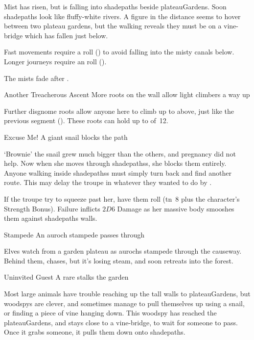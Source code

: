 \begin{boxtext}
  Mist has risen, but is falling into \gls{shadepaths} beside \gls{plateauGardens}.
  Soon \gls{shadepaths} look like fluffy-white rivers.
  A figure in the distance seems to hover between two plateau gardens, but the walking reveals they must be on a vine-bridge which has fallen just below.
\end{boxtext}

Fast movements require a  roll (\tn[8]) to avoid falling into the misty canals below.
Longer journeys require an  roll (\tn[10]).

The mists fade after .

{Another Treacherous Ascent}%
{More roots on the wall allow light climbers a way up}%

Further \gls{disgnome} roots allow anyone here to climb up to  above, just like the previous \gls{segment} ().
These roots can hold up to  of~12.


{Excuse Me!}%
{A giant snail blocks the path}%

`Brownie' the snail grew much bigger than the others, and pregnancy did not help.
Now when she moves through \glspl{shadepaths}, she blocks them entirely.
Anyone walking inside \glspl{shadepaths} must simply turn back and find another route.
This may delay the troupe in whatever they wanted to do by .

If the troupe try to squeeze past her, have them roll  (\gls{tn}~8 plus the character's Strength Bonus).
Failure inflicts $2D6$ Damage as her massive body smooshes them against \gls{shadepaths} walls.

{Stampede}%
{An auroch stampede passes through}%

\label{sunwayEarthIngredients}
Elves watch from a garden plateau as aurochs stampede through the causeway.
Behind them,  chases, but it's losing steam, and soon retreats into the forest.

{Uninvited Guest}%
{A rare  stalks the garden}%

\label{plateauWaterIngredient}
Most large animals have trouble reaching up the tall walls to \gls{plateauGardens}, but \glspl{woodspy} are clever, and sometimes manage to pull themselves up using a snail, or finding a piece of vine hanging down.
This \gls{woodspy} has reached the \gls{plateauGardens}, and stays close to a vine-bridge, to wait for someone to pass.
Once it grabs someone, it pulls them down onto \gls{shadepaths}.

